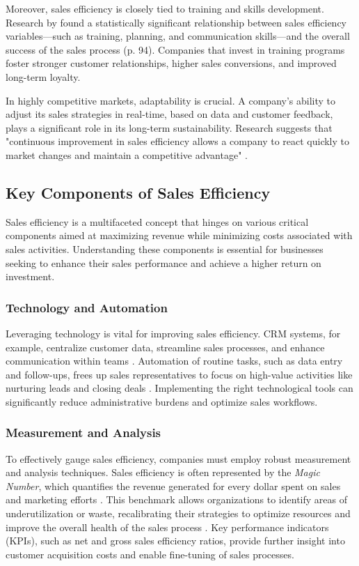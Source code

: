Moreover, sales efficiency is closely tied to training and skills development. Research by \cite{elaageb2019} found a statistically significant relationship between sales efficiency variables—such as training, planning, and communication skills—and the overall success of the sales process (p. 94). Companies that invest in training programs foster stronger customer relationships, higher sales conversions, and improved long-term loyalty.

In highly competitive markets, adaptability is crucial. A company's ability to adjust its sales strategies in real-time, based on data and customer feedback, plays a significant role in its long-term sustainability. Research suggests that "continuous improvement in sales efficiency allows a company to react quickly to market changes and maintain a competitive advantage" \cite{kohonen2022}.



\subsection{Key Components of Sales Efficiency}

Sales efficiency is a multifaceted concept that hinges on various critical components aimed at maximizing revenue while minimizing costs associated with sales activities. Understanding these components is essential for businesses seeking to enhance their sales performance and achieve a higher return on investment.

\subsubsection{Technology and Automation}
Leveraging technology is vital for improving sales efficiency. CRM systems, for example, centralize customer data, streamline sales processes, and enhance communication within teams \cite{pipedrive, trackmage}. Automation of routine tasks, such as data entry and follow-ups, frees up sales representatives to focus on high-value activities like nurturing leads and closing deals \cite{vanillasoft}. Implementing the right technological tools can significantly reduce administrative burdens and optimize sales workflows.

\subsubsection{Measurement and Analysis}
To effectively gauge sales efficiency, companies must employ robust measurement and analysis techniques. Sales efficiency is often represented by the \textit{Magic Number}, which quantifies the revenue generated for every dollar spent on sales and marketing efforts \cite{clevenue}. This benchmark allows organizations to identify areas of underutilization or waste, recalibrating their strategies to optimize resources and improve the overall health of the sales process \cite{pipedrive, clevenue}. Key performance indicators (KPIs), such as net and gross sales efficiency ratios, provide further insight into customer acquisition costs and enable fine-tuning of sales processes.

